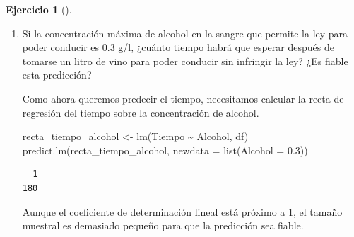 \documentclass[
  spanish,
  a4paper,
]{scrreport}
\newenvironment{Shaded}{\begin{snugshade}}{\end{snugshade}}
\newcommand{\AttributeTok}[1]{\textcolor[rgb]{0.40,0.45,0.13}{#1}}
\newcommand{\FloatTok}[1]{\textcolor[rgb]{0.68,0.00,0.00}{#1}}
\newcommand{\FunctionTok}[1]{\textcolor[rgb]{0.28,0.35,0.67}{#1}}
\newcommand{\NormalTok}[1]{\textcolor[rgb]{0.00,0.23,0.31}{#1}}
\newcommand{\OtherTok}[1]{\textcolor[rgb]{0.00,0.23,0.31}{#1}}
\newcommand{\SpecialCharTok}[1]{\textcolor[rgb]{0.37,0.37,0.37}{#1}}
\theoremstyle{definition}
\newtheorem{exercise}{Ejercicio}[chapter]
\theoremstyle{remark}
\begin{document}
\begin{exercise}[]
\begin{enumerate}
\begin{tcolorbox}
  Así pues, la velocidad de metabolización del alcohol es 0.0099048
  g/l\(\cdot\)min.

  \end{tcolorbox}
\item
  Si la concentración máxima de alcohol en la sangre que permite la ley
  para poder conducir es \(0.3\) g/l, ¿cuánto tiempo habrá que esperar
  después de tomarse un litro de vino para poder conducir sin infringir
  la ley? ¿Es fiable esta predicción?

  \begin{tcolorbox}[enhanced jigsaw, arc=.35mm, bottomrule=.15mm, bottomtitle=1mm, breakable, colback=white, colbacktitle=quarto-callout-tip-color!10!white, colframe=quarto-callout-tip-color-frame, coltitle=black, left=2mm, leftrule=.75mm, opacityback=0, opacitybacktitle=0.6, rightrule=.15mm, title=\textcolor{quarto-callout-tip-color}{\faLightbulb}\hspace{0.5em}{Solución}, titlerule=0mm, toprule=.15mm, toptitle=1mm]

  Como ahora queremos predecir el tiempo, necesitamos calcular la recta
  de regresión del tiempo sobre la concentración de alcohol.

\begin{Shaded}
\begin{Highlighting}[]
\NormalTok{recta\_tiempo\_alcohol }\OtherTok{\textless{}{-}} \FunctionTok{lm}\NormalTok{(Tiempo }\SpecialCharTok{\textasciitilde{}}\NormalTok{ Alcohol, df) }
\FunctionTok{predict.lm}\NormalTok{(recta\_tiempo\_alcohol, }\AttributeTok{newdata =} \FunctionTok{list}\NormalTok{(}\AttributeTok{Alcohol =} \FloatTok{0.3}\NormalTok{))}
\end{Highlighting}
\end{Shaded}

\begin{verbatim}
  1 
180 
\end{verbatim}

  Aunque el coeficiente de determinación lineal está próximo a 1, el
  tamaño muestral es demasiado pequeño para que la predicción sea
  fiable.

  \end{tcolorbox}
\end{enumerate}

\end{exercise}
\end{document}
